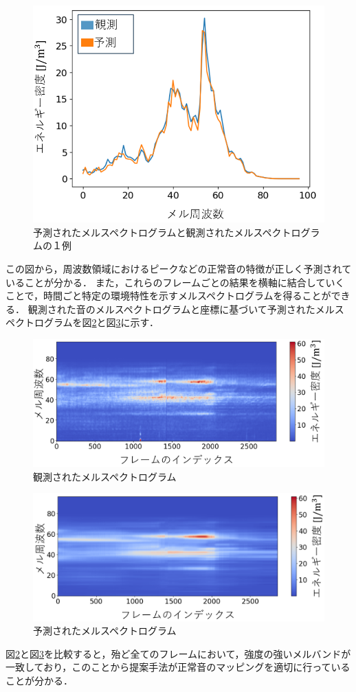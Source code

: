 \documentclass[../main]{subfiles}
\begin{document}
\begin{figure}[t]
  \centering
  \includegraphics[keepaspectratio, width=0.7\linewidth]{chap4/comparison_pre_mel.png}
  \caption{予測されたメルスペクトログラムと観測されたメルスペクトログラムの１例}
  \label{fig:comparison_pre_mel}
\end{figure}

この図から，周波数領域におけるピークなどの正常音の特徴が正しく予測されていることが分かる．
また，これらのフレームごとの結果を横軸に結合していくことで，時間ごと特定の環境特性を示すメルスペクトログラムを得ることができる．
観測された音のメルスペクトログラムと座標に基づいて予測されたメルスペクトログラムを図\ref{fig:observed_mel}と図\ref{fig:predicted_mel}に示す．

\begin{figure}[t]
  \centering
  \includegraphics[keepaspectratio, width=0.8\linewidth]{chap4/observed_mel.png}
  \caption{観測されたメルスペクトログラム}
  \label{fig:observed_mel}
\end{figure}

\begin{figure}[t]
  \centering
  \includegraphics[keepaspectratio, width=0.8\linewidth]{chap4/predicted_mel.png}
  \caption{予測されたメルスペクトログラム}
  \label{fig:predicted_mel}
\end{figure}
図\ref{fig:observed_mel}と図\ref{fig:predicted_mel}を比較すると，殆ど全てのフレームにおいて，強度の強いメルバンドが一致しており，このことから提案手法が正常音のマッピングを適切に行っていることが分かる．
\end{document}
